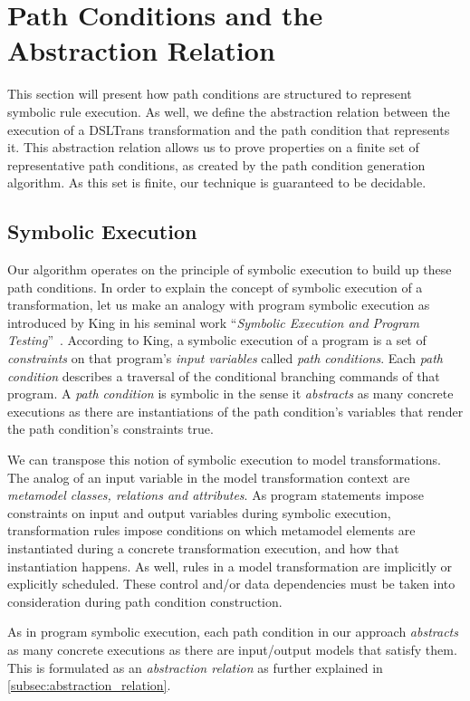 \section{Path Conditions and the Abstraction Relation}
\label{sec:abstraction_relation}


This section will present how path conditions are structured to represent symbolic rule execution. As well, we define the abstraction relation between the execution of a DSLTrans transformation and the path condition that represents it.
This abstraction relation allows us to prove properties on a finite set of representative path conditions, as created by the path condition generation algorithm. As this set is finite, our technique is guaranteed to be decidable.


\subsection{Symbolic Execution}

Our algorithm operates on the principle of symbolic execution to build up these
path conditions. In order to explain the concept of symbolic execution of a
transformation, let us make an analogy with program symbolic execution as
introduced by King in his seminal work ``\emph{Symbolic Execution and Program
Testing}''~\cite{DBLP:journals/cacm/King76}. According to King, a symbolic
execution of a program is a set of \emph{constraints} on that program's
\emph{input variables} called \emph{path conditions}. Each \emph{path condition}
describes a traversal of the conditional branching commands of that program. A
\emph{path condition} is symbolic in the sense it \emph{abstracts} as many
concrete executions as there are instantiations of the path condition's
variables that render the path condition's constraints true.

We can transpose this notion of symbolic execution to model transformations. The
analog of an input variable in the model transformation context are
\emph{metamodel classes, relations and attributes}. As program statements impose
constraints on input and output variables during symbolic execution,
transformation rules impose conditions on which metamodel elements are
instantiated during a concrete transformation execution, and how that
instantiation happens. As well, rules in a model transformation are implicitly
or explicitly scheduled. These control and/or data dependencies must be
taken into consideration during path condition construction.

As in program symbolic execution, each path condition in our approach \emph{abstracts} as many concrete executions as there are input/output models
that satisfy them. This is formulated as an \emph{abstraction relation} as further explained in \cref{subsec:abstraction_relation}.


